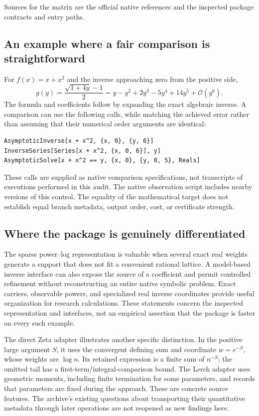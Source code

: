 \documentclass[11pt,letterpaper]{article}
\newcommand{\OO}{\mathcal{O}}
\theoremstyle{definition}\newtheorem{definition}[proposition]{Definition}
\begin{document}
\noindent Sources for the matrix are the official native references and the
inspected package contracts and entry paths.\cite{wlseries,wlinverse,wlcompose,wlasymptotic,wlasymptoticsolve,wlsd,core,operations,dirichlet,native,contracts,certificates}

\subsection{An example where a fair comparison is straightforward}
For $f(x)=x+x^2$ and the inverse approaching zero from the positive side,
\begin{equation}
 g(y)=\frac{\sqrt{1+4y}-1}{2}
      =y-y^2+2y^3-5y^4+14y^5+\OO(y^6).
\end{equation}
The formula and coefficients follow by expanding the exact algebraic inverse.
A comparison can use the following calls, while matching the achieved error
rather than assuming that their numerical order arguments are identical:
\begin{lstlisting}
AsymptoticInverse[x + x^2, {x, 0}, {y, 6}]
InverseSeries[Series[x + x^2, {x, 0, 6}], y]
AsymptoticSolve[x + x^2 == y, {x, 0}, {y, 0, 5}, Reals]
\end{lstlisting}
These calls are supplied as native comparison specifications, not transcripts
of executions performed in this audit. The native observation script includes
nearby versions of this control. The equality of the mathematical target does
not establish equal branch metadata, output order, cost, or certificate strength.

\subsection{Where the package is genuinely differentiated}
The sparse power--log representation is valuable when several exact real
weights generate a support that does not fit a convenient rational lattice.
A model-based inverse interface can also expose the source of a coefficient
and permit controlled refinement without reconstructing an entire native
symbolic problem. Exact carriers, observable powers, and specialized real
inverse coordinates provide useful organization for research calculations.
These statements concern the inspected representation and interfaces, not an
empirical assertion that the package is faster on every such example.
\cite{core,operations,refinement}

The direct Zeta adapter illustrates another specific distinction. In the
positive large argument $S$, it uses the convergent defining sum and coordinate
$w=e^{-S}$, whose weights are $\log n$. Its retained expression is a finite sum
of $n^{-S}$; the omitted tail has a first-term/integral-comparison bound.
The Lerch adapter uses geometric moments, including finite termination for
some parameters, and records that parameters are fixed during the approach.
These are concrete source features. The archive's existing questions about
transporting their quantitative metadata through later operations are not
reopened as new findings here.\cite{dirichlet,register}
\end{document}
